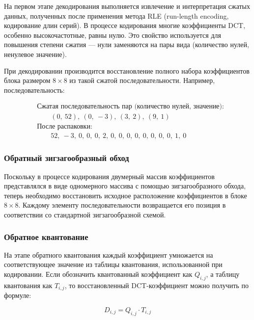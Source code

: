 На первом этапе декодирования выполняется извлечение и интерпретация сжатых данных, 
полученных после применения метода RLE (run-length encoding, кодирование длин серий). 
В процессе кодирования многие коэффициенты DCT, особенно высокочастотные, равны нулю. 
Это свойство используется для повышения степени сжатия — нули заменяются на пары вида (количество нулей, ненулевое значение).

При декодировании производится восстановление полного набора коэффициентов блока размером $8 \times 8$
из такой сжатой последовательности. Например, последовательность:

\begin{equation}
    \label{eq:rle_example}
    \begin{aligned}
        &\text{Сжатая последовательность пар (количество нулей, значение):} \\
        &\qquad (0,\ 52),\ (0,\ -3),\ (3,\ 2),\ (9,\ 1) \\
        &\text{После распаковки:} \\
        &\qquad 52,\ -3,\ 0,\ 0,\ 0,\ 2,\ 0,\ 0,\ 0,\ 0,\ 0,\ 0,\ 0,\ 0,\ 1,\ 0
    \end{aligned}
\end{equation}



\subsubsection{Обратный зигзагообразный обход}
Поскольку в процессе кодирования двумерный массив коэффициентов представлялся в виде одномерного массива 
с помощью зигзагообразного обхода, теперь необходимо восстановить исходное расположение коэффициентов в блоке $8 \times 8$. 
Каждому элементу последовательности возвращается его позиция в соответствии со стандартной зигзагообразной схемой.




\subsubsection{Обратное квантование}
На этапе обратного квантования каждый коэффициент умножается на соответствующее значение из таблицы квантования, 
использованной при кодировании. Если обозначить квантованный коэффициент как $Q_{i,j}$, а таблицу квантования как $T_{i,j}$,
то восстановленный DCT-коэффициент можно получить по формуле:

\begin{equation}
    D_{i,j} = Q_{i,j} \cdot T_{i,j}
\end{equation}

